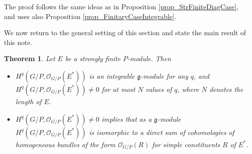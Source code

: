 \documentclass[12pt]{article}
\def \OO {{\mathcal O}}
\def \g {\mathfrak{g}}
\newtheorem{theorem}{Theorem}[section]
\begin{document}
The proof follows the same ideas as in Proposition \ref{prop_StrFiniteDiagCase}, and uses also Proposition \ref{prop_FinitaryCaseIntegrable}. 

We now return to the general setting of this section and state the main result of this note.

\begin{theorem} \label{thm_DirectSum} %
Let $E$ be a strongly finite $P$-module. Then 
\begin{itemize}
\item [(i)] $H^q(G/P, \OO_{G/P}(E^*))$ is an integrable $\g$-module for any $q$, and $H^q(G/P, \OO_{G/P}(E^*)) \neq 0$ for at most $N$ values of $q$, where $N$ denotes the length of $E$.
\item [(ii)] $H^q(G/P, \OO_{G/P}(E^*)) \neq 0$ implies that as a $\g$-module $H^q(G/P, \OO_{G/P}(E^*))$ is isomorphic to a direct sum of cohomologies of homogeneous bundles of the form $\OO_{G/P}(R)$ for simple constituents $R$ of $E^*$.
\end{itemize}
\end{theorem}
\end{document}
